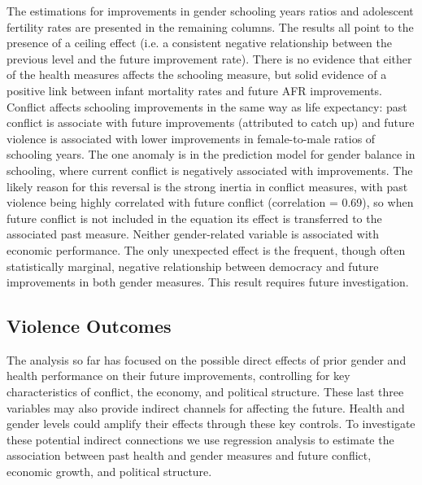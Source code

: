 \documentclass[12pt]{article}
\begin{document}
The estimations for improvements in gender schooling years ratios and adolescent fertility rates are presented in the remaining columns. The results all point to the presence of a ceiling effect (i.e. a consistent negative relationship between the previous level and the future improvement rate). There is no evidence that either of the health measures affects the schooling measure, but solid evidence of a positive link between infant mortality rates and future AFR improvements. Conflict affects schooling improvements in the same way as life expectancy: past conflict is associate with future improvements (attributed to catch up) and future violence is associated with lower improvements in female-to-male ratios of schooling years. The one anomaly is in the prediction model for gender balance in schooling, where current conflict is negatively associated with improvements. The likely reason for this reversal is the strong inertia in conflict measures, with past violence being highly correlated with future conflict (correlation = 0.69), so when future conflict is not included in the equation its effect is transferred to the associated past measure. Neither gender-related variable is associated with economic performance. The only unexpected effect is the frequent, though often statistically marginal, negative relationship between democracy and future improvements in both gender measures. This result requires future investigation.

\subsection{Violence Outcomes}

The analysis so far has focused on the possible direct effects of prior gender and health performance on their future improvements, controlling for key characteristics of conflict, the economy, and political structure. These last three variables may also provide indirect channels for affecting the future. Health and gender levels could amplify their effects through these key controls. To investigate these potential indirect connections we use regression analysis to estimate the association between past health and gender measures and future conflict, economic growth, and political structure.
\end{document}
